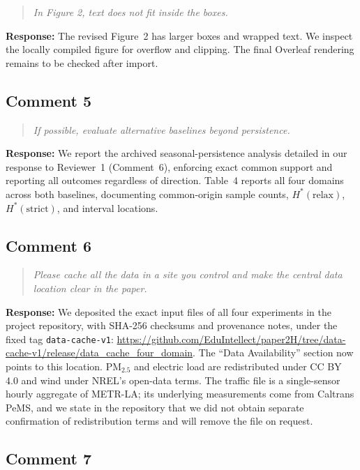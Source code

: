 \documentclass[11pt,a4paper]{article}
\let\originalsubsection\subsection
\renewcommand{\subsection}{\Needspace{9\baselineskip}\originalsubsection}
\newenvironment{reviewcomment}
  {\begin{quote}\itshape}
  {\end{quote}}
\newcommand{\response}{\noindent\textbf{Response:} }
\begin{document}
\begin{reviewcomment}
In Figure 2, text does not fit inside the boxes.
\end{reviewcomment}

\response
The revised Figure~2 has larger boxes and wrapped text. We inspect the
locally compiled figure for overflow and clipping. The final Overleaf
rendering remains to be checked after import.


\subsection*{Comment 5}

\begin{reviewcomment}
If possible, evaluate alternative baselines beyond persistence.
\end{reviewcomment}

\response
We report the archived seasonal-persistence analysis
detailed in our response to Reviewer~1 (Comment~6), enforcing exact common
support and reporting all outcomes regardless of direction. Table~4 reports
all four domains across both baselines, documenting common-origin sample
counts, $H^*(\mathrm{relax})$, $H^*(\mathrm{strict})$, and interval locations.


\subsection*{Comment 6}

\begin{reviewcomment}
Please cache all the data in a site you control and make the central
data location clear in the paper.
\end{reviewcomment}

\response
We deposited the exact input files of all four experiments in the project
repository, with SHA-256 checksums and provenance notes, under the fixed tag
\texttt{data-cache-v1}:
\url{https://github.com/EduIntellect/paper2H/tree/data-cache-v1/release/data_cache_four_domain}.
The ``Data Availability'' section now points to this location. PM$_{2.5}$ and electric
load are redistributed under CC BY 4.0 and wind under NREL's open-data terms. The traffic file is a
single-sensor hourly aggregate of METR-LA; its underlying measurements come from Caltrans PeMS, and
we state in the repository that we did not obtain separate confirmation of redistribution terms and will
remove the file on request.


\subsection*{Comment 7}
\end{document}

